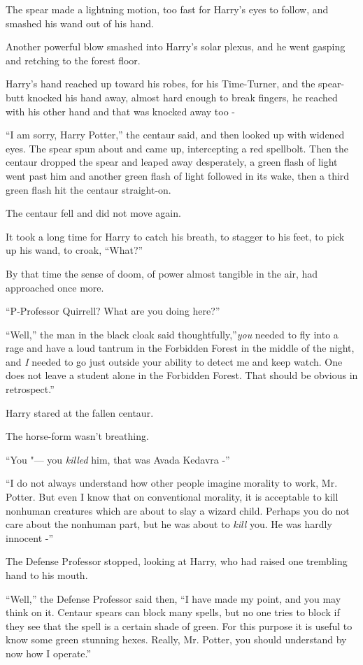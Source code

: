 The spear made a lightning motion, too fast for Harry's eyes to follow,
and smashed his wand out of his hand.

Another powerful blow smashed into Harry's solar plexus, and he went
gasping and retching to the forest floor.

Harry's hand reached up toward his robes, for his Time-Turner, and the
spear-butt knocked his hand away, almost hard enough to break fingers,
he reached with his other hand and that was knocked away too -

``I am sorry, Harry Potter,'' the centaur said, and then looked up with
widened eyes. The spear spun about and came up, intercepting a red
spellbolt. Then the centaur dropped the spear and leaped away
desperately, a green flash of light went past him and another green
flash of light followed in its wake, then a third green flash hit the
centaur straight-on.

The centaur fell and did not move again.

It took a long time for Harry to catch his breath, to stagger to his
feet, to pick up his wand, to croak, ``What?''

By that time the sense of doom, of power almost tangible in the air, had
approached once more.

``P-Professor Quirrell? What are you doing here?''

``Well,'' the man in the black cloak said thoughtfully,''\emph{you}
needed to fly into a rage and have a loud tantrum in the Forbidden
Forest in the middle of the night, and \emph{I} needed to go just
outside your ability to detect me and keep watch. One does not leave a
student alone in the Forbidden Forest. That should be obvious in
retrospect.''

Harry stared at the fallen centaur.

The horse-form wasn't breathing.

``You "--- you \emph{killed} him, that was Avada Kedavra -''

``I do not always understand how other people imagine morality to work,
Mr. Potter. But even I know that on conventional morality, it is
acceptable to kill nonhuman creatures which are about to slay a wizard
child. Perhaps you do not care about the nonhuman part, but he was about
to \emph{kill} you. He was hardly innocent -''

The Defense Professor stopped, looking at Harry, who had raised one
trembling hand to his mouth.

``Well,'' the Defense Professor said then, ``I have made my point, and
you may think on it. Centaur spears can block many spells, but no one
tries to block if they see that the spell is a certain shade of green.
For this purpose it is useful to know some green stunning hexes. Really,
Mr. Potter, you should understand by now how I operate.''

